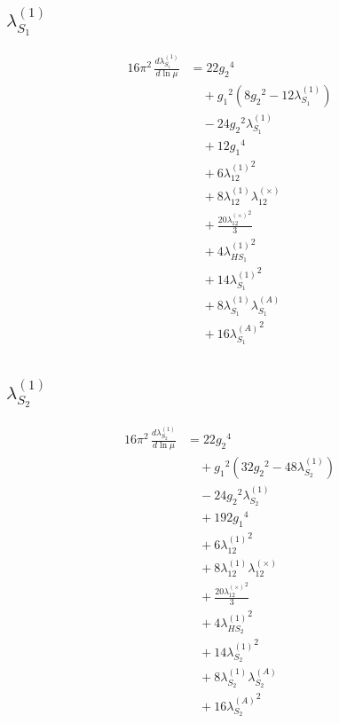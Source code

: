 \documentclass[10pt,a4paper]{article}
\begin{document}
\subsection*{$\lambda_{S_1}^{(1)}$}
\begin{align*}
16\pi^2\,\frac{d \lambda_{S_1}^{(1)}}{d\ln\mu} &=22 {g_2}^4 \\
&\quad +{g_1}^2 \left(8 {g_2}^2-12 {\lambda_{S_1}^{(1)}}\right) \\
&\quad -24 {g_2}^2 {\lambda_{S_1}^{(1)}} \\
&\quad +12 {g_1}^4 \\
&\quad +6 {\lambda_{12}^{(1)}}^2 \\
&\quad +8 {\lambda_{12}^{(1)}} {\lambda_{12}^{(\times)}} \\
&\quad +\frac{20 {\lambda_{12}^{(\times)}}^2}{3} \\
&\quad +4 {\lambda_{HS_1}^{(1)}}^2 \\
&\quad +14 {\lambda_{S_1}^{(1)}}^2 \\
&\quad +8 {\lambda_{S_1}^{(1)}} {\lambda_{S_1}^{(A)}} \\
&\quad +16 {\lambda_{S_1}^{(A)}}^2 \\
\end{align*}
\subsection*{$\lambda_{S_2}^{(1)}$}
\begin{align*}
16\pi^2\,\frac{d \lambda_{S_2}^{(1)}}{d\ln\mu} &=22 {g_2}^4 \\
&\quad +{g_1}^2 \left(32 {g_2}^2-48 {\lambda_{S_2}^{(1)}}\right) \\
&\quad -24 {g_2}^2 {\lambda_{S_2}^{(1)}} \\
&\quad +192 {g_1}^4 \\
&\quad +6 {\lambda_{12}^{(1)}}^2 \\
&\quad +8 {\lambda_{12}^{(1)}} {\lambda_{12}^{(\times)}} \\
&\quad +\frac{20 {\lambda_{12}^{(\times)}}^2}{3} \\
&\quad +4 {\lambda_{HS_2}^{(1)}}^2 \\
&\quad +14 {\lambda_{S_2}^{(1)}}^2 \\
&\quad +8 {\lambda_{S_2}^{(1)}} {\lambda_{S_2}^{(A)}} \\
&\quad +16 {\lambda_{S_2}^{(A)}}^2 \\
\end{align*}
\end{document}
